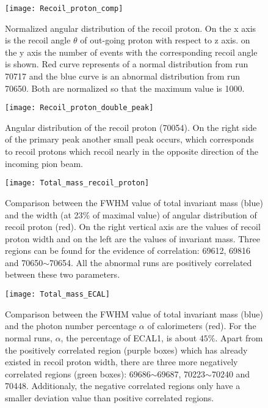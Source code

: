 \begin{figure}[!b]
	\centering
	\texttt{[image: Recoil\_proton\_comp]}
	\caption{Normalized angular distribution of the recoil proton. On the x axis is the recoil angle $\theta$ of out-going proton with respect to z axis. on the y axis the number of events with the corresponding recoil angle is shown. Red curve represents of a normal distribution from run 70717 and the blue curve is an abnormal distribution from run 70650. Both are normalized so that the maximum value is 1000. }
	\label{fig:Recoil_proton_comp}
\end{figure}

\begin{figure}[!b]
	\centering
	\texttt{[image: Recoil\_proton\_double\_peak]}
	\caption{Angular distribution of the recoil proton (70054). On the right side of the primary peak another small peak occurs, which corresponds to recoil protons which recoil nearly in the opposite direction of the incoming pion beam. }
	\label{fig:Recoil_proton_double_peak}
\end{figure}

\begin{figure*}[!h]
	\centering
	\vspace{1cm}
	\texttt{[image: Total\_mass\_recoil\_proton]}
	\caption{Comparison between the FWHM value of total invariant mass (blue) and the width (at 23\% of maximal value) of angular distribution of recoil proton (red). On the right vertical axis are the values of recoil proton width and on the left are the values of invariant mass. Three regions can be found for the evidence of correlation: 69612, 69816 and 70650$\sim$70654. All the abnormal runs are positively correlated between these two parameters.}
	\label{fig:Total_mass_recoil_proton}
	\vspace{1 cm}
	
	\texttt{[image: Total\_mass\_ECAL]}
	\caption{Comparison between the FWHM value of total invariant mass (blue) and the photon number percentage $\alpha$ of calorimeters (red). For the normal runs, $\alpha$, the percentage of ECAL1, is about $45\%$. Apart from the positively correlated region (purple boxes) which has already existed in recoil proton width, there are three more negatively correlated regions (green boxes): 69686$\sim$69687, 70223$\sim$70240 and 70448. Additionaly, the negative correlated regions only have a smaller deviation value than positive correlated regions.}
	\label{fig:Total_mass_ECAL}
	\vspace{1cm}
\end{figure*}

